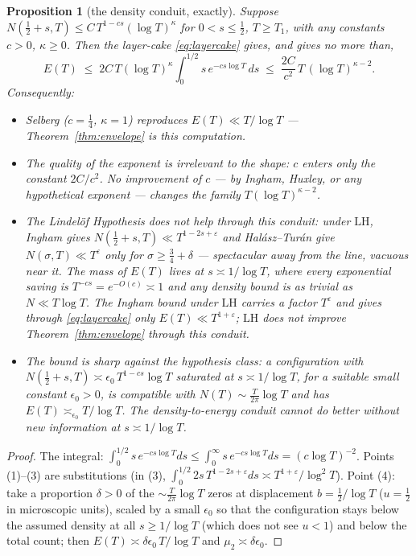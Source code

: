 \documentclass[11pt]{amsart}
\theoremstyle{plain}
\newtheorem{proposition}[theorem]{Proposition}
\theoremstyle{definition}
\theoremstyle{remark}
\newcommand{\LH}{\mathrm{LH}}
\begin{document}
\begin{proposition}[the density conduit, exactly]\label{prop:densitybarrier}
Suppose $N(\tfrac12+s,T)\le C\,T^{1-cs}(\log T)^{\kappa}$ for $0<s\le\tfrac12$, $T\ge T_1$, with any constants $c>0$, $\kappa\ge0$. Then the layer-cake \eqref{eq:layercake} gives, and gives no more than,
\[
E(T)\;\le\;2C\,T(\log T)^{\kappa}\int_0^{1/2}s\,e^{-cs\log T}\,ds\;\le\;\frac{2C}{c^2}\,T\,(\log T)^{\kappa-2}.
\]
Consequently:
\begin{itemize}
\item[\textup{(1)}] Selberg \textup{(}$c=\tfrac14$, $\kappa=1$\textup{)} reproduces $E(T)\ll T/\log T$ --- Theorem~\ref{thm:envelope} \emph{is} this computation.
\item[\textup{(2)}] The quality of the exponent is irrelevant to the shape: $c$ enters only the constant $2C/c^2$. No improvement of $c$ --- by Ingham, Huxley, or any hypothetical exponent --- changes the family $T(\log T)^{\kappa-2}$.
\item[\textup{(3)}] The Lindel\"of Hypothesis does not help through this conduit: under $\LH$, Ingham gives $N(\tfrac12+s,T)\ll T^{1-2s+\varepsilon}$ and Hal\'asz--Tur\'an \cite{HalaszTuran1969} give $N(\sigma,T)\ll T^\varepsilon$ only for $\sigma\ge\tfrac34+\delta$ --- spectacular away from the line, vacuous near it. The mass of $E(T)$ lives at $s\asymp1/\log T$, where every exponential saving is $T^{-cs}=e^{-O(c)}\asymp1$ and any density bound is as trivial as $N\ll T\log T$. The Ingham bound under $\LH$ carries a factor $T^\varepsilon$ and gives through \eqref{eq:layercake} only $E(T)\ll T^{1+\varepsilon}$; $\LH$ does not improve Theorem~\ref{thm:envelope} through this conduit.
\item[\textup{(4)}] The bound is sharp against the hypothesis class: a configuration with $N(\tfrac12+s,T)\asymp\epsilon_0\,T^{1-cs}\log T$ saturated at $s\asymp1/\log T$, for a suitable small constant $\epsilon_0>0$, is compatible with $N(T)\sim\frac{T}{2\pi}\log T$ and has $E(T)\asymp_{\epsilon_0}T/\log T$. The density-to-energy conduit cannot do better without new information \emph{at} $s\asymp1/\log T$.
\end{itemize}
\end{proposition}

\begin{proof}
The integral: $\int_0^{1/2}s\,e^{-cs\log T}ds\le\int_0^\infty s\,e^{-cs\log T}ds=(c\log T)^{-2}$. Points (1)--(3) are substitutions (in (3), $\int_0^{1/2}2s\,T^{1-2s+\varepsilon}ds\asymp T^{1+\varepsilon}/\log^2T$). Point (4): take a proportion $\delta>0$ of the $\sim\frac T{2\pi}\log T$ zeros at displacement $b=\tfrac12/\log T$ ($u=\tfrac12$ in microscopic units), scaled by a small $\epsilon_0$ so that the configuration stays below the assumed density at all $s\ge1/\log T$ (which does not see $u<1$) and below the total count; then $E(T)\asymp\delta\epsilon_0\,T/\log T$ and $\mu_2\asymp\delta\epsilon_0$.
\end{proof}
\end{document}
